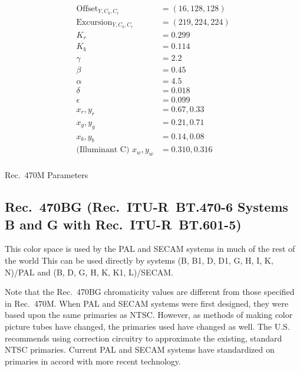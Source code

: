 \documentclass[11pt,letterpaper]{book}
\numberwithin{equation}{chapter}
\numberwithin{figure}{chapter}
\numberwithin{table}{chapter}
\begin{document}
\begin{table}[htb]
\begin{align*}
\mathrm{Offset}_{Y,C_b,C_r}    & = (16, 128, 128)  \\
\mathrm{Excursion}_{Y,C_b,C_r} & = (219, 224, 224) \\
K_r                            & = 0.299           \\
K_b                            & = 0.114           \\
\gamma                         & = 2.2             \\
\beta                          & = 0.45            \\
\alpha                         & = 4.5             \\
\delta                         & = 0.018           \\
\epsilon                       & = 0.099           \\
x_r,y_r                        & = 0.67, 0.33      \\
x_g,y_g                        & = 0.21, 0.71      \\
x_b,y_b                        & = 0.14, 0.08      \\
\text{(Illuminant C) } x_w,y_w & = 0.310, 0.316    \\
\end{align*}
\caption{Rec.~470M Parameters}
\label{tab:470m}
\end{table}

\subsection{Rec.~470BG (Rec.~ITU-R~BT.470-6 Systems B and G with
 Rec.~ITU-R~BT.601-5)}
\label{sec:470bg}

This color space is used by the PAL and SECAM systems in much of the rest of
 the world \cite{rec470}
This can be used directly by systems (B, B1, D, D1, G, H, I, K, N)/PAL and (B,
 D, G, H, K, K1, L)/SECAM\@.

Note that the Rec.~470BG chromaticity values are different from those
 specified in Rec.~470M\@.
When PAL and SECAM systems were first designed, they were based upon the same
 primaries as NTSC\@.
However, as methods of making color picture tubes have changed, the primaries
 used have changed as well.
The U.S. recommends using correction circuitry to approximate the existing,
 standard NTSC primaries.
Current PAL and SECAM systems have standardized on primaries in accord with
 more recent technology.
\end{document}
